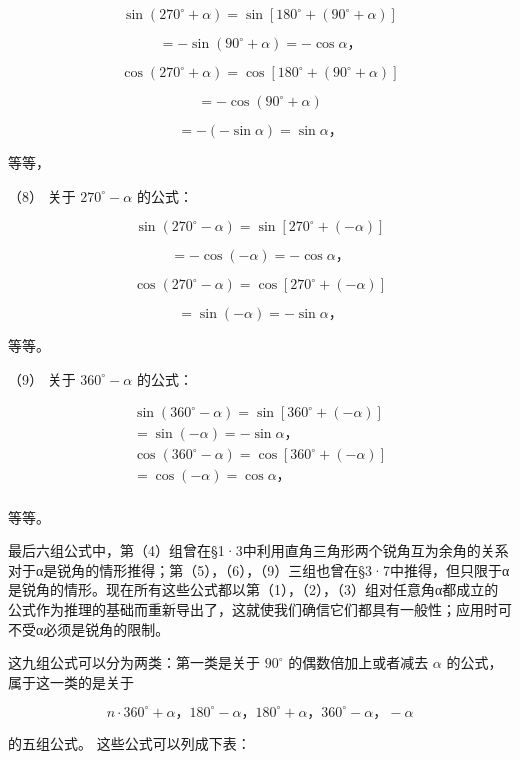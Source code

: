 \[
\sin (270 ^{\circ} + \alpha) = \sin [ 180 ^{\circ} + (90 ^{\circ} + \alpha) ]
\]

\[
= - \sin (90 ^{\circ} + \alpha) = - \cos \alpha \text{，}
\]

\[
\cos (270 ^{\circ} + \alpha) = \cos [ 180 ^{\circ} + (90 ^{\circ} + \alpha) ]
\]

\[
= - \cos (90 ^{\circ} + \alpha)
\]

\[
= - (- \sin \alpha) = \sin \alpha \text{，}
\]

等等，

（8） 关于 \(270^{\circ} - \alpha\) 的公式：

\[
\sin (270 ^{\circ} - \alpha) = \sin [ 270 ^{\circ} + (- \alpha) ]
\]

\[
= - \cos (- \alpha) = - \cos \alpha \text{，}
\]

\[
\cos (270 ^{\circ} - \alpha) = \cos [ 270 ^{\circ} + (- \alpha) ]
\]

\[
= \sin (- \alpha) = - \sin \alpha \text{，}
\]

等等。

（9） 关于 \(360^{\circ} - \alpha\) 的公式：

\[
\begin{array}{l} \sin (360 ^{\circ} - \alpha) = \sin [ 360 ^{\circ} + (- \alpha) ] \\ = \sin (- \alpha) = - \sin \alpha \text{，} \\ \cos (360 ^{\circ} - \alpha) = \cos [ 360 ^{\circ} + (- \alpha) ] \\ = \cos (- \alpha) = \cos \alpha \text{，} \\ \end{array}
\]

等等。

最后六组公式中，第（4）组曾在§1·3中利用直角三角形两个锐角互为余角的关系对于α是锐角的情形推得；第（5），（6），（9）三组也曾在§3·7中推得，但只限于α是锐角的情形。现在所有这些公式都以第（1），（2），（3）组对任意角α都成立的公式作为推理的基础而重新导出了，这就使我们确信它们都具有一般性；应用时可不受α必须是锐角的限制。

这九组公式可以分为两类：第一类是关于 \(90^{\circ}\) 的偶数倍加上或者减去
\(\alpha\) 的公式，属于这一类的是关于

\[
n \cdot 360 ^{\circ} + \alpha \text{，} 180 ^{\circ} - \alpha \text{，} 180 ^{\circ} + \alpha \text{，} 360 ^{\circ} - \alpha \text{，} - \alpha
\]

的五组公式。 这些公式可以列成下表：

